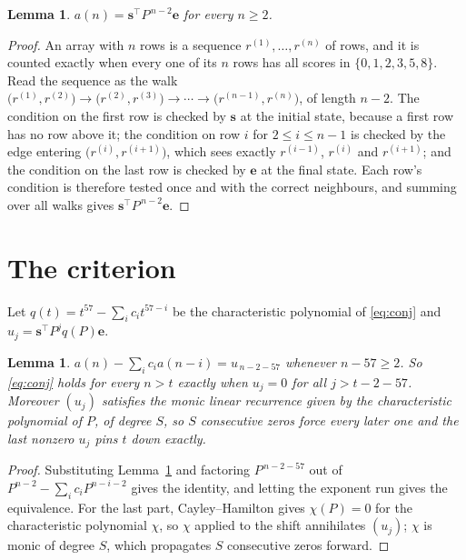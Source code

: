 \documentclass[11pt,a4paper]{article}
\theoremstyle{plain}
\newtheorem{lemma}[theorem]{Lemma}
\theoremstyle{definition}
\begin{document}
\begin{lemma}\label{lem:walk}
$a(n)=\mathbf{s}^{\!\top}P^{\,n-2}\mathbf{e}$ for every $n\ge2$.
\end{lemma}

\begin{proof}
An array with $n$ rows is a sequence $r^{(1)},\dots,r^{(n)}$ of rows, and it is counted
exactly when every one of its $n$ rows has all scores in $\{0,1,2,3,5,8\}$. Read the sequence as the
walk $\bigl(r^{(1)},r^{(2)}\bigr)\to\bigl(r^{(2)},r^{(3)}\bigr)\to\cdots\to
\bigl(r^{(n-1)},r^{(n)}\bigr)$, of length $n-2$. The condition on the first row is
checked by $\mathbf{s}$ at the initial state, because a first row has no row above it; the
condition on row $i$ for $2\le i\le n-1$ is checked by the edge entering
$\bigl(r^{(i)},r^{(i+1)}\bigr)$, which sees exactly $r^{(i-1)}$, $r^{(i)}$ and
$r^{(i+1)}$; and the condition on the last row is checked by $\mathbf{e}$ at the final
state. Each row's condition is therefore tested once and with the correct neighbours, and
summing over all walks gives $\mathbf{s}^{\!\top}P^{\,n-2}\mathbf{e}$.
\end{proof}

\section{The criterion}

Let $q(t)=t^{57}-\sum_i c_i t^{57-i}$ be the characteristic polynomial of
\eqref{eq:conj} and $u_j=\mathbf{s}^{\!\top}P^{j}q(P)\mathbf{e}$.

\begin{lemma}\label{lem:crit}
$a(n)-\sum_i c_i a(n-i)=u_{\,n-2-57}$ whenever $n-57\ge2$. So \eqref{eq:conj}
holds for every $n>t$ exactly when $u_j=0$ for all $j>t-2-57$. Moreover $(u_j)$
satisfies the monic linear recurrence given by the characteristic polynomial of $P$, of
degree $S$, so $S$ consecutive zeros force every later one and the last nonzero $u_j$ pins
$t$ down exactly.
\end{lemma}

\begin{proof}
Substituting Lemma~\ref{lem:walk} and factoring $P^{\,n-2-57}$ out of
$P^{n-2}-\sum_i c_i P^{n-i-2}$ gives the identity, and letting the exponent run gives the
equivalence. For the last part, Cayley--Hamilton gives $\chi(P)=0$ for the characteristic
polynomial $\chi$, so $\chi$ applied to the shift annihilates $(u_j)$; $\chi$ is monic of
degree $S$, which propagates $S$ consecutive zeros forward.
\end{proof}
\end{document}
